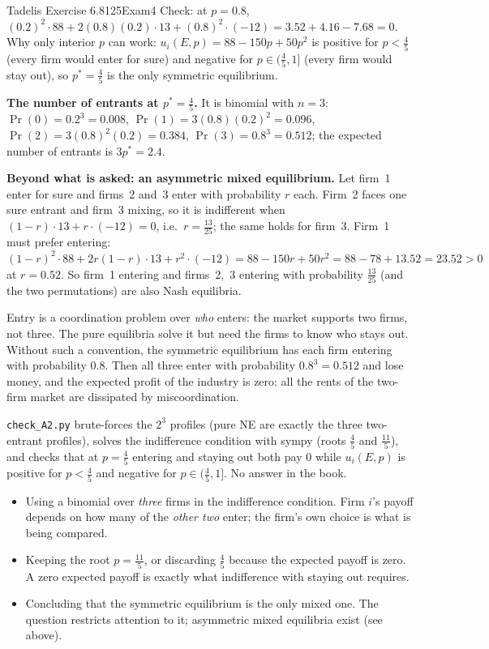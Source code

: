 \begin{exsol}{Tadelis Exercise 6.8}{125}{Exam}{4}
Check: at $p = 0.8$, $(0.2)^2\cdot 88 + 2(0.8)(0.2)\cdot 13 + (0.8)^2\cdot(-12)
= 3.52 + 4.16 - 7.68 = 0$. Why only interior $p$ can work: $u_i(E,p) = 88 - 150p + 50p^2$ is
positive for $p < \tfrac45$ (every firm would enter for sure) and negative for $p \in (\tfrac45, 1]$
(every firm would stay out), so $p^* = \tfrac45$ is the only symmetric equilibrium.

\textbf{The number of entrants at $p^* = \tfrac45$.} It is binomial with $n = 3$:
$\Pr(0) = 0.2^3 = 0.008$, $\Pr(1) = 3(0.8)(0.2)^2 = 0.096$, $\Pr(2) = 3(0.8)^2(0.2) = 0.384$,
$\Pr(3) = 0.8^3 = 0.512$; the expected number of entrants is $3p^* = 2.4$.

\textbf{Beyond what is asked: an asymmetric mixed equilibrium.} Let firm~1 enter for sure and
firms~2 and~3 enter with probability $r$ each. Firm~2 faces one sure entrant and firm~3 mixing, so
it is indifferent when $(1-r)\cdot 13 + r\cdot(-12) = 0$, i.e.\ $r = \tfrac{13}{25}$; the same holds
for firm~3. Firm~1 must prefer entering: $(1-r)^2\cdot 88 + 2r(1-r)\cdot 13 + r^2\cdot(-12)
= 88 - 150r + 50r^2 = 88 - 78 + 13.52 = 23.52 > 0$ at $r = 0.52$. So firm~1 entering and
firms~2,~3 entering with probability $\tfrac{13}{25}$ (and the two permutations) are also Nash
equilibria.

\interp Entry is a coordination problem over \emph{who} enters: the market supports two firms, not
three. The pure equilibria solve it but need the firms to know who stays out. Without such a
convention, the symmetric equilibrium has each firm entering with probability $0.8$. Then all three
enter with probability $0.8^3 = 0.512$ and lose money, and the expected profit of the industry is
zero: all the rents of the two-firm market are dissipated by miscoordination.

\verify \texttt{check\_A2.py} brute-forces the $2^3$ profiles (pure NE are exactly the three
two-entrant profiles), solves the indifference condition with sympy (roots $\tfrac45$ and
$\tfrac{11}{5}$), and checks that at $p = \tfrac45$ entering and staying out both pay $0$ while
$u_i(E,p)$ is positive for $p < \tfrac45$ and negative for $p \in (\tfrac45, 1]$. No answer in the
book.

\mistakes
\begin{itemize}
  \item Using a binomial over \emph{three} firms in the indifference condition. Firm $i$'s payoff depends on how many of the \emph{other two} enter; the firm's own choice is what is being compared.
  \item Keeping the root $p = \tfrac{11}{5}$, or discarding $\tfrac45$ because the expected payoff is zero. A zero expected payoff is exactly what indifference with staying out requires.
  \item Concluding that the symmetric equilibrium is the only mixed one. The question restricts attention to it; asymmetric mixed equilibria exist (see above).
\end{itemize}


\end{exsol}

